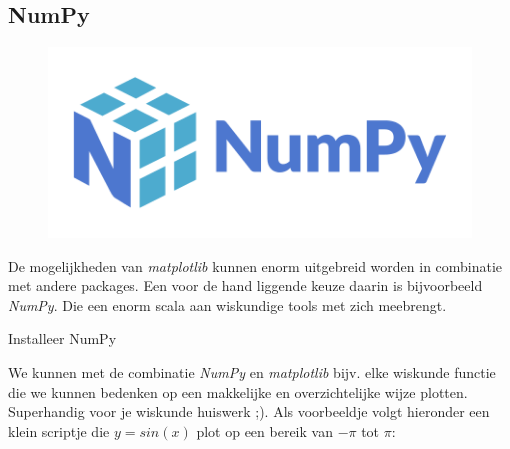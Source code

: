 \newpage

\subsection{NumPy}

\begin{figure}[!ht]
\centering\includegraphics[scale=0.5]{Pictures/chapter07/numpy_logo.png}
\label{fig:numpylogo} %
\end{figure}

De mogelijkheden van \textit{matplotlib} kunnen enorm uitgebreid worden in combinatie met andere packages. Een voor de hand liggende keuze daarin is bijvoorbeeld \textit{NumPy}. Die een enorm scala aan wiskundige tools met zich meebrengt. 

\begin{exercise}
Installeer NumPy 
\end{exercise}
We kunnen met de combinatie \textit{NumPy} en \textit{matplotlib} bijv. elke wiskunde functie die we kunnen bedenken op een makkelijke en overzichtelijke wijze plotten. Superhandig voor je wiskunde huiswerk ;). Als voorbeeldje volgt hieronder een klein scriptje die $y = sin(x)$ plot op een bereik van $-\pi$ tot $\pi$:

\newpage



